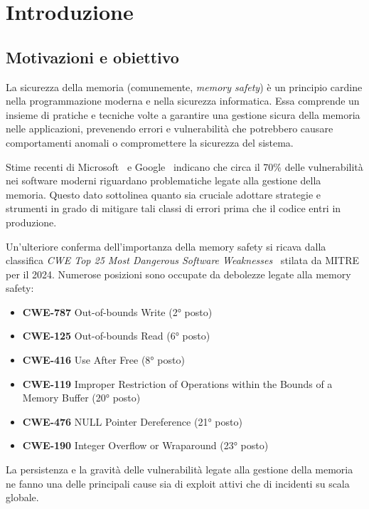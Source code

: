\chapter{Introduzione}
\label{cha:introduction_new}

\section*{Motivazioni e obiettivo}
\label{sec:motivation} La sicurezza della memoria (comunemente, \textit{memory
safety}) è un principio cardine nella programmazione moderna e nella sicurezza
informatica. Essa comprende un insieme di pratiche e tecniche volte a garantire una
gestione sicura della memoria nelle applicazioni, prevenendo errori e
vulnerabilità che potrebbero causare comportamenti anomali o compromettere la
sicurezza del sistema.

Stime recenti di Microsoft~\cite{microsoft_proactive_approach} e Google~\cite{chromium_memory_safety}
indicano che circa il 70\% delle vulnerabilità nei software moderni riguardano problematiche
legate alla gestione della memoria. Questo dato sottolinea quanto sia cruciale
adottare strategie e strumenti in grado di mitigare tali classi di errori prima
che il codice entri in produzione.

Un'ulteriore conferma dell'importanza della memory safety si ricava dalla
classifica \textit{CWE Top 25 Most Dangerous Software Weaknesses}~\cite{cwe_top25_2024}
stilata da MITRE per il 2024. Numerose posizioni sono occupate da debolezze legate
alla memory safety:
\begin{itemize}
  \item \textbf{CWE-787} Out-of-bounds Write (2° posto)

  \item \textbf{CWE-125} Out-of-bounds Read (6° posto)

  \item \textbf{CWE-416} Use After Free (8° posto)

  \item \textbf{CWE-119} Improper Restriction of Operations within the Bounds of
    a Memory Buffer (20° posto)

  \item \textbf{CWE-476} NULL Pointer Dereference (21° posto)

  \item \textbf{CWE-190} Integer Overflow or Wraparound (23° posto)
\end{itemize}
La persistenza e la gravità delle vulnerabilità legate alla gestione della
memoria ne fanno una delle principali cause sia di exploit attivi che di
incidenti su scala globale.

